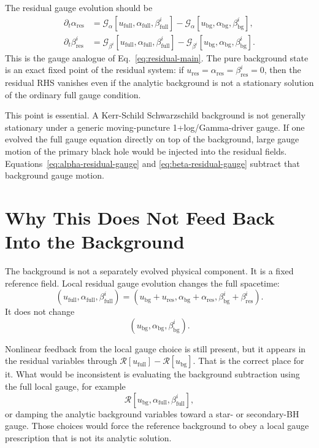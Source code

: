 \documentclass[11pt]{article}
\newcommand{\ubg}{u_{\mathrm{bg}}}
\newcommand{\ures}{u_{\mathrm{res}}}
\newcommand{\ufull}{u_{\mathrm{full}}}
\newcommand{\abg}{\alpha_{\mathrm{bg}}}
\newcommand{\ares}{\alpha_{\mathrm{res}}}
\newcommand{\afull}{\alpha_{\mathrm{full}}}
\newcommand{\bbg}{\beta^i_{\mathrm{bg}}}
\newcommand{\bres}{\beta^i_{\mathrm{res}}}
\newcommand{\bfull}{\beta^i_{\mathrm{full}}}
\newcommand{\rhs}{\mathcal{R}}
\newcommand{\gaugea}{\mathcal{G}_{\alpha}}
\newcommand{\gaugeb}{\mathcal{G}_{\beta^i}}
\begin{document}
The residual gauge evolution should be
\begin{align}
  \partial_t \ares
  &=
  \gaugea[\ufull,\afull,\bfull]
  -
  \gaugea[\ubg,\abg,\bbg],
  \label{eq:alpha-residual-gauge}
  \\
  \partial_t \bres
  &=
  \gaugeb[\ufull,\afull,\bfull]
  -
  \gaugeb[\ubg,\abg,\bbg].
  \label{eq:beta-residual-gauge}
\end{align}
This is the gauge analogue of Eq.~\eqref{eq:residual-main}.  The pure
background state is an exact fixed point of the residual system: if
\(\ures=\ares=\bres=0\), then the residual RHS vanishes even if the analytic
background is not a stationary solution of the ordinary full gauge condition.

This point is essential.  A Kerr-Schild Schwarzschild background is not
generally stationary under a generic moving-puncture 1+log/Gamma-driver gauge.
If one evolved the full gauge equation directly on top of the background,
large gauge motion of the primary black hole would be injected into the
residual fields.  Equations~\eqref{eq:alpha-residual-gauge} and
\eqref{eq:beta-residual-gauge} subtract that background gauge motion.

\section{Why This Does Not Feed Back Into the Background}

The background is not a separately evolved physical component.  It is a fixed
reference field.  Local residual gauge evolution changes the full spacetime:
\begin{equation}
  (\ufull,\afull,\bfull)
  =
  (\ubg+\ures,\abg+\ares,\bbg+\bres).
\end{equation}
It does not change
\begin{equation}
  (\ubg,\abg,\bbg).
\end{equation}

Nonlinear feedback from the local gauge choice is still present, but it appears
in the residual variables through \(\rhs[\ufull]-\rhs[\ubg]\).  That is the
correct place for it.  What would be inconsistent is evaluating the background
subtraction using the full local gauge, for example
\begin{equation}
  \rhs[\ubg,\afull,\bfull],
\end{equation}
or damping the analytic background variables toward a star- or secondary-BH
gauge.  Those choices would force the reference background to obey a local
gauge prescription that is not its analytic solution.
\end{document}
